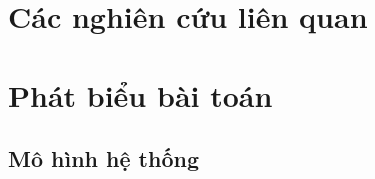 \documentclass[10pt, conference, a4paper, compsocconf]{IEEEtran}
\begin{document}
\section{Các nghiên cứu liên quan}
%

\section{Phát biểu bài toán}
\label{sec:problem}

\subsection{Mô hình hệ thống}
\end{document}
